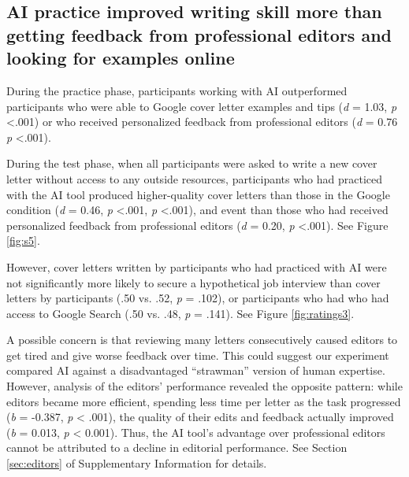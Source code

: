 \documentclass[11pt]{report}
\begin{document}
\begin{mainf}
\subsection*{AI practice improved writing skill more than getting feedback from professional editors and looking for examples online}

During the practice phase, participants working with AI outperformed participants who were able to Google cover letter examples and tips (\textit{d} = 1.03, \textit{p} \textless .001) or who received personalized feedback from professional editors (\textit{d} = 0.76 \textit{p} \textless .001). 

During the test phase, when all participants were asked to write a new cover letter without access to any outside resources, participants who had practiced with the AI tool produced higher-quality cover letters than those in the Google condition (\emph{d} = 0.46, \textit{p} \textless .001,
\emph{p} \textless.001), and event than those who had received personalized feedback from professional editors (\textit{d} = 0.20, \emph{p} \textless .001). See Figure \ref{fig:s5}. 



However, cover letters written by participants who had practiced with AI were not significantly more likely to secure a hypothetical job interview than cover letters by participants  (.50 vs. .52, \textit{p} = .102), or participants who had who had access to Google Search  (.50 vs. .48, \textit{p} = .141). See Figure \ref{fig:ratings3}.


A possible concern is that reviewing many letters consecutively caused editors to get tired and give worse feedback over time. This could suggest our experiment compared AI against a disadvantaged ``strawman'' version of human expertise. However, analysis of the editors’ performance revealed the opposite pattern: while editors became more efficient, spending less time per letter as the task progressed (\textit{b} = -0.387, \textit{p} < .001), the quality of their edits and feedback actually improved (\textit{b} = 0.013, \textit{p} < 0.001). Thus, the AI tool’s advantage over professional editors cannot be attributed to a decline in editorial performance. See Section \ref{sec:editors} of Supplementary Information for details.


\end{mainf}
\end{document}
